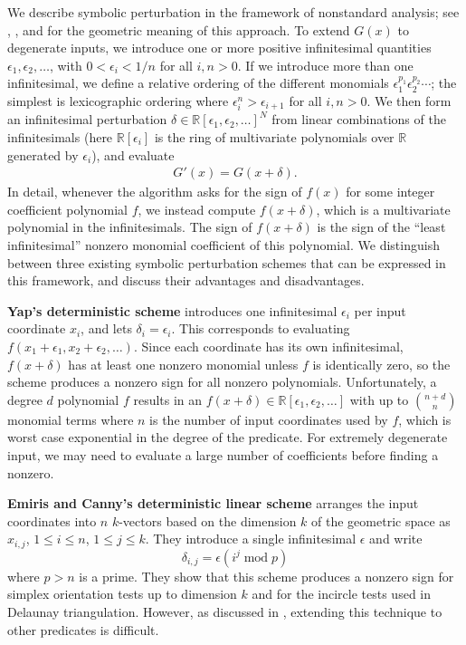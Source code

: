 \documentclass[11pt]{article}
\newcommand{\R}{\mathbb{R}}
\begin{document}
We describe symbolic perturbation in the framework of nonstandard analysis; see \cite{yap1990symbolic}, \cite{emiris1995general},
and \cite{seidel1998nature} for the geometric meaning of this approach.  To extend $G(x)$ to degenerate inputs, we introduce one
or more positive infinitesimal quantities $\epsilon_1, \epsilon_2, \ldots$, with $0 < \epsilon_i < 1/n$ for all $i,n > 0$.  If
we introduce more than one infinitesimal, we define a relative ordering of the different monomials $\epsilon_1^{p_1} \epsilon_2^{p_2} \cdots$;
the simplest is lexicographic ordering where $\epsilon_i^n > \epsilon_{i+1}$ for all $i,n > 0$.
We then form an infinitesimal perturbation $\delta \in \R[\epsilon_1,\epsilon_2, \ldots]^N$ from
linear combinations of the infinitesimals (here $\R[\epsilon_i]$ is the ring of multivariate polynomials over $\R$ generated by $\epsilon_i$), and evaluate
\begin{align*}
G'(x) = G(x+\delta).
\end{align*}
In detail, whenever the algorithm asks for the sign of $f(x)$ for some integer coefficient polynomial $f$, we instead compute
$f(x+\delta)$, which is a multivariate polynomial in the infinitesimals.  The sign of $f(x+\delta)$ is the sign of the ``least infinitesimal''
nonzero monomial coefficient of this polynomial.
We distinguish between three existing symbolic perturbation schemes that can be expressed in this framework, and discuss their advantages
and disadvantages.

{\bf Yap's deterministic scheme} \cite{yap1990symbolic} introduces one infinitesimal $\epsilon_i$ per input coordinate $x_i$, and lets $\delta_i = \epsilon_i$.  This
corresponds to evaluating $f(x_1+\epsilon_1, x_2+\epsilon_2, \ldots)$.  Since each coordinate has its own infinitesimal, $f(x+\delta)$ has at least
one nonzero monomial unless $f$ is identically zero, so the scheme produces a nonzero sign for all nonzero polynomials.  Unfortunately, a degree $d$ polynomial
$f$ results in an $f(x+\delta) \in \R[\epsilon_1,\epsilon_2, \ldots]$ with up to $\binom{n + d}{n}$ monomial terms where $n$ is the number of input
coordinates used by $f$, which is worst case exponential in the degree of the predicate.  For extremely degenerate input, we may need to evaluate a large
number of coefficients before finding a nonzero.

{\bf Emiris and Canny's deterministic linear scheme} \cite{emiris1992efficient} arranges the input coordinates into $n$ $k$-vectors based on the dimension
$k$ of the geometric space as $x_{i,j}$, $1 \le i \le n$, $1 \le j \le k$.  They introduce a single infinitesimal $\epsilon$ and write
$$\delta_{i,j} = \epsilon (i^j \operatorname{mod} p)$$
where $p > n$ is a prime.  They show that this scheme produces a nonzero sign for simplex orientation tests up to dimension $k$ and for
the incircle tests used in Delaunay triangulation.  However, as discussed in \cite{seidel1998nature}, extending this technique to other predicates
is difficult.
\end{document}
